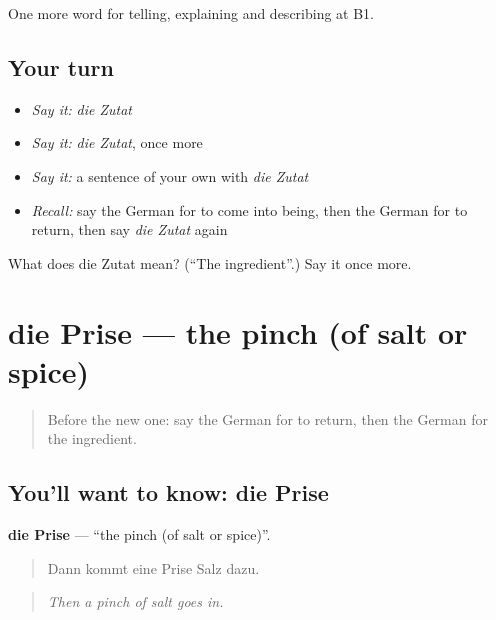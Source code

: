 \begin{grammarlens}[title={What you've built}]
One more word for telling, explaining and describing at B1.
\end{grammarlens}

\subsection*{Your turn}
\begin{itemize}
\raggedright
  \item \emph{Say it:} \emph{die Zutat}
  \item \emph{Say it:} \emph{die Zutat}, once more
  \item \emph{Say it:} a sentence of your own with \emph{die Zutat}
  \item \emph{Recall:} say the German for to come into being, then the German for to return, then say \emph{die Zutat} again
\end{itemize}

\begin{tcolorbox}[breakable,colback=teal!4,colframe=teal!35!black,title={Before you move on}]
What does die Zutat mean? (\textquotedblleft{}The ingredient\textquotedblright{}.) Say it once more.
\end{tcolorbox}
\section[die Prise]{die Prise — the pinch (of salt or spice)}

\label{lesson:GE-C322-prise}



\begin{quote}
Before the new one: say the German for to return, then the German for the ingredient.
\end{quote}

\subsection*{You'll want to know: die Prise}
\textbf{die Prise} — \textquotedblleft{}the pinch (of salt or spice)\textquotedblright{}.

\begin{quote}
Dann kommt eine Prise Salz dazu.
\end{quote}

\begin{quote}
\emph{Then a pinch of salt goes in.}
\end{quote}

